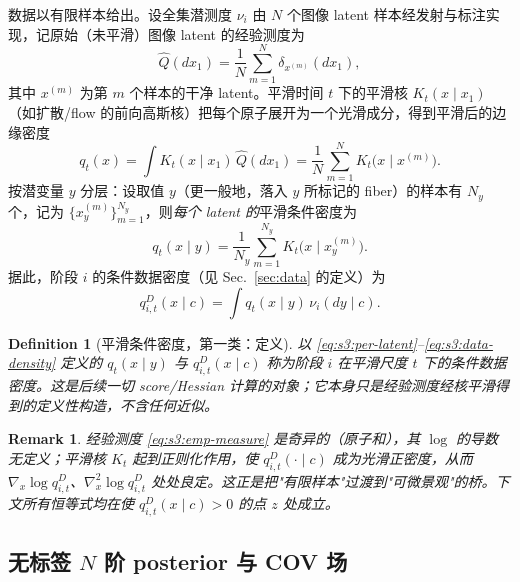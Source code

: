 \documentclass[11pt,a4paper]{article}
\newtheorem{definition}[theorem]{Definition}
\newtheorem{remark}[theorem]{Remark}
\begin{document}
数据以有限样本给出。设全集潜测度 $\nu_i$ 由 $N$ 个图像 latent 样本经发射与标注实现，记原始（未平滑）图像 latent 的经验测度为
\begin{equation}\label{eq:s3:emp-measure}
\widehat{Q}(dx_1)=\frac{1}{N}\sum_{m=1}^{N}\delta_{x^{(m)}}(dx_1),
\end{equation}
其中 $x^{(m)}$ 为第 $m$ 个样本的干净 latent。平滑时间 $t$ 下的平滑核 $K_t(x\mid x_1)$（如扩散/flow 的前向高斯核）把每个原子展开为一个光滑成分，得到平滑后的边缘密度
\begin{equation}\label{eq:s3:smooth-marg}
q_t(x)=\int K_t(x\mid x_1)\,\widehat{Q}(dx_1)=\frac{1}{N}\sum_{m=1}^{N}K_t\!\big(x\mid x^{(m)}\big).
\end{equation}
按潜变量 $y$ 分层：设取值 $y$（更一般地，落入 $y$ 所标记的 fiber）的样本有 $N_y$ 个，记为 $\{x_y^{(m)}\}_{m=1}^{N_y}$，则\emph{每个 latent 的}平滑条件密度为
\begin{equation}\label{eq:s3:per-latent}
q_t(x\mid y)=\frac{1}{N_y}\sum_{m=1}^{N_y}K_t\!\big(x\mid x_y^{(m)}\big).
\end{equation}
据此，阶段 $i$ 的条件数据密度（见 Sec.~\ref{sec:data} 的定义）为
\begin{equation}\label{eq:s3:data-density}
q_{i,t}^{D}(x\mid c)=\int q_t(x\mid y)\,\nu_i(dy\mid c).
\end{equation}

\begin{definition}[平滑条件密度，第一类：定义]\label{def:s3:smoothed}
以 \eqref{eq:s3:per-latent}--\eqref{eq:s3:data-density} 定义的 $q_t(x\mid y)$ 与 $q_{i,t}^{D}(x\mid c)$ 称为阶段 $i$ 在平滑尺度 $t$ 下的\emph{条件数据密度}。这是后续一切 score/Hessian 计算的对象；它本身只是经验测度经核平滑得到的定义性构造，不含任何近似。
\end{definition}

\begin{remark}\label{rem:s3:regularize}
经验测度 \eqref{eq:s3:emp-measure} 是奇异的（原子和），其 $\log$ 的导数无定义；平滑核 $K_t$ 起到正则化作用，使 $q_{i,t}^{D}(\cdot\mid c)$ 成为光滑正密度，从而 $\nabla_x\log q_{i,t}^{D}$、$\nabla_x^2\log q_{i,t}^{D}$ 处处良定。这正是把"有限样本"过渡到"可微景观"的桥。下文所有恒等式均在使 $q_{i,t}^{D}(x\mid c)>0$ 的点 $z$ 处成立。
\end{remark}

\subsection{无标签 $N$ 阶 posterior 与 COV 场}\label{subsec:s3:unlabeledNcov}
\end{document}
